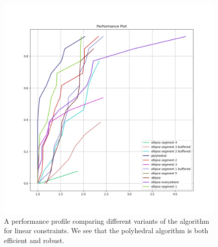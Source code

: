 \documentclass{article}
\begin{document}
	
\begin{figure}[ht]
    \centering
    \includegraphics[scale=0.4]{images/performance_profile_plot.png}
    \caption[A performance profile comparing variants of the algorithm for linear constraints.]{
    	A performance profile comparing different variants of the algorithm for linear constraints.
    	We see that the polyhedral algorithm is both efficient and robust.
    }
    \label{performance_profile_image}
\end{figure}






% 
% 
% 




\end{document}

